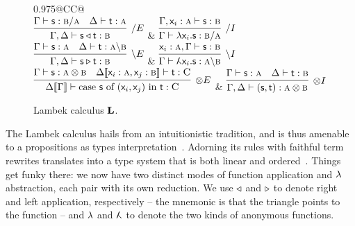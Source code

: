 \begin{figure}
	\centering
	\begin{tabularx}{0.975\textwidth}{@{}CC@{}}
		\\[2em]
		$\infer[\divright E]{\Gamma, \Delta \vdash \term{s}\appright\term{t}: \prop{b}}{\Gamma \vdash  \term{s}: \prop{b} \divright \prop{a} & \Delta \vdash \term{t}: \prop{a}}$
		& 
		$\infer[\divright I]{\Gamma \vdash \term{\lam \vari .s}: \prop{b} \divright \prop{a}}{\Gamma, \term{\vari }: \prop{a} \vdash \term{s}: \prop{b}}$\\[2em]
		$\infer[\divleft E]{\Gamma, \Delta \vdash \term{s}\appleft\term{t}:\prop{b}}{\Gamma \vdash \term{s}:\prop{a} & \Delta \vdash \term{t}:\prop{a}\divleft\prop{b}}$
		& 
		$\infer[\divleft I]{\Gamma \vdash \term{\adbmal \vari .s}: \prop{a} \divleft \prop{b}}{\term{\vari }: \prop{a}, \Gamma \vdash \term{s}: \prop{b}}$\\[2em]
		$\infer[\otimes E]{\Delta\ctx{\Gamma} \vdash \cterm{case \term{s} of \term{(\vari , \varj)} in \term{t}}: \prop C}{
			\Gamma \vdash \term{s}: \prop{a}\otimes\prop{b}
			&
			\Delta\ctx{\term{\vari }: \prop{a}, \term{\varj}: \prop{b}}  \vdash \term{t}: \prop C}$
		&
		$\infer[\otimes I]{\Gamma,\Delta \vdash \term{(s,t)}: \prop{a} \otimes \prop{b}}{\Gamma \vdash \term{s}: \prop{a} & \Delta \vdash \term{t}: \prop{b}}$\\[2em]
	\end{tabularx}
	\caption{Lambek calculus $\textbf{L}$.}
	\label{figure:lambek_calculus_rules}
\end{figure}

The Lambek calculus hails from an intuitionistic tradition, and is thus amenable to a propositions as types interpretation~\cite{wansing1990formulas}.
Adorning its rules with faithful term rewrites translates into a type system that is both linear and ordered~\cite{pierce2004advanced}.
Things get funky there: we now have two distinct modes of function application and $\mathnormal{\lambda}$ abstraction, each pair with its own reduction.
We use $\triangleleft$ and $\triangleright$ to denote right and left application, respectively -- the mnemonic is that the triangle points to the function -- and $\mathnormal{\lambda}$ and $\adbmal$ to denote the two kinds of anonymous functions.

